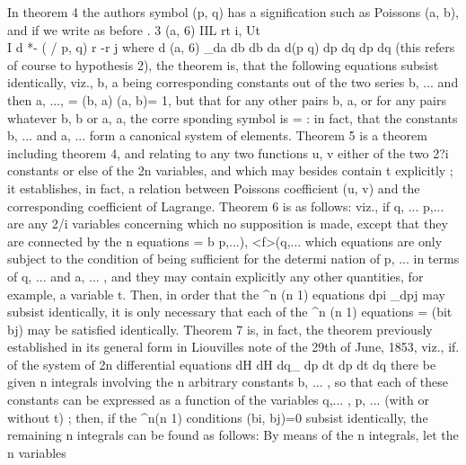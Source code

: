 \documentclass[11pt,a4paper]{book}
\begin{document}
In theorem 4 the authors symbol (p, q) has a signification such as Poissons (a, b),
and if we write as before
. 3 (a, 6)
IIL rt i, Ut\\ I d *- ( / p, q) r -r j
where
d (a, 6) _da db db da
d(p q) dp dq dp dq
(this refers of course to hypothesis 2), the theorem is, that the following equations
subsist identically, viz., b, a being corresponding constants out of the two series b, ...
and then
a, ...,
=
(b, a) (a, b)= 1,
but that for any other pairs b, a, or for any pairs whatever b, b or a, a, the corre
sponding symbol is = : in fact, that the constants b, ... and a, ... form a canonical
system of elements.
Theorem 5 is a theorem including theorem 4, and relating to any two functions
u, v either of the two 2?i constants or else of the 2n variables, and which may besides
contain t explicitly ; it establishes, in fact, a relation between Poissons coefficient (u, v)
and the corresponding coefficient of Lagrange.
Theorem 6 is as follows: viz., if q, ... p,... are any 2/i variables concerning which
no supposition is made, except that they are connected by the n equations
=
b p,...),
<f>(q,...
which equations are only subject to the condition of being sufficient for the determi
nation of p, ... in terms of q, ... and a, ... , and they may contain explicitly any
other quantities, for example, a variable t. Then, in order that the ^n (n 1) equations
dpi _dpj
may subsist identically, it is only necessary that each of the ^n (n 1) equations
=
(bit bj) may be satisfied identically.
Theorem 7 is, in fact, the theorem previously established in its general form in
Liouvilles note of the 29th of June, 1853, viz., if. of the system of 2n differential
equations
dH dH
dq_ dp
dt dp dt dq
there be given n integrals involving the n arbitrary constants b, ... , so that each of
these constants can be expressed as a function of the variables q,... , p, ... (with or
without t) ; then, if the ^n(n 1) conditions (bi, bj)=0 subsist identically, the remaining
n integrals can be found as follows: By means of the n integrals, let the n variables


\end{document}
